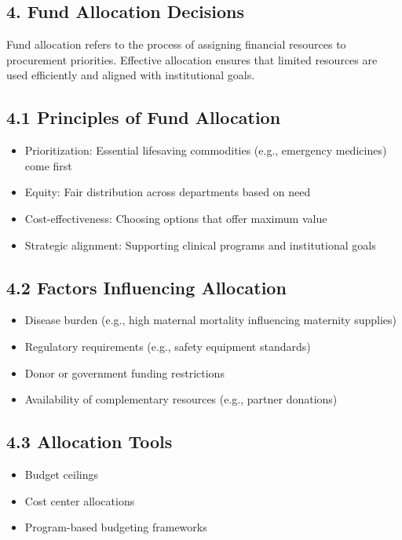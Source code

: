 \documentclass[10pt]{article}
\begin{document}
\subsection*{4. Fund Allocation Decisions}
Fund allocation refers to the process of assigning financial resources to procurement priorities. Effective allocation ensures that limited resources are used efficiently and aligned with institutional goals.

\subsection*{4.1 Principles of Fund Allocation}
\begin{itemize}
  \item Prioritization: Essential lifesaving commodities (e.g., emergency medicines) come first
  \item Equity: Fair distribution across departments based on need
  \item Cost-effectiveness: Choosing options that offer maximum value
  \item Strategic alignment: Supporting clinical programs and institutional goals
\end{itemize}

\subsection*{4.2 Factors Influencing Allocation}
\begin{itemize}
  \item Disease burden (e.g., high maternal mortality influencing maternity supplies)
  \item Regulatory requirements (e.g., safety equipment standards)
  \item Donor or government funding restrictions
  \item Availability of complementary resources (e.g., partner donations)
\end{itemize}

\subsection*{4.3 Allocation Tools}
\begin{itemize}
  \item Budget ceilings
  \item Cost center allocations
  \item Program-based budgeting frameworks
\end{itemize}
\end{document}
